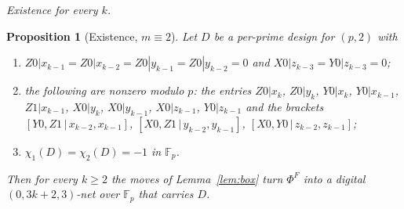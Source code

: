 \documentclass[11pt]{amsart}
\newtheorem{proposition}[theorem]{Proposition}
\theoremstyle{definition}
\theoremstyle{plain}
\newcommand{\F}{\mathbb{F}}
\begin{document}
\smallskip\noindent\emph{Existence for every $k$.}

\begin{proposition}[Existence, $m\equiv2$]\label{prop:pp2}
Let $D$ be a per-prime design for $(p,2)$ with
\begin{enumerate}
\sloppy
\item[(V2)] $Z0|x_{k-1}=Z0|x_{k-2}=Z0|y_{k-1}=Z0|y_{k-2}=0$ and $X0|z_{k-3}=Y0|z_{k-3}=0$;
\item[(U2)] the following are nonzero modulo $p$: the entries $Z0|x_k$, $Z0|y_k$, $Y0|x_k$, $Y0|x_{k-1}$, $Z1|x_{k-1}$, $X0|y_k$, $X0|y_{k-1}$, $X0|z_{k-1}$, $Y0|z_{k-1}$ and the brackets $[Y0,Z1\,|\allowbreak\,x_{k-2},x_{k-1}]$, $[X0,Z1\,|\allowbreak\,y_{k-2},y_{k-1}]$, $[X0,Y0\,|\allowbreak\,z_{k-2},z_{k-1}]$;
\item[(I2)] $\chi_1(D)=\chi_2(D)=-1$ in $\F_p$.
\end{enumerate}
Then for every $k\ge2$ the moves of Lemma~\ref{lem:box} turn $\Phi^F$ into a digital $(0,3k+2,3)$-net over $\F_p$ that carries $D$.
\end{proposition}
\end{document}
